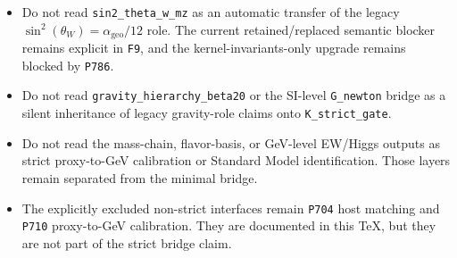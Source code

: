 \begin{itemize}
  \item Do not read \texttt{sin2\_theta\_w\_mz} as an automatic transfer of the legacy $\sin^2(\theta_W)=\alpha_{\mathrm{geo}}/12$ role. The current retained/replaced semantic blocker remains explicit in \texttt{F9}, and the kernel-invariants-only upgrade remains blocked by \texttt{P786}.
  \item Do not read \texttt{gravity\_hierarchy\_beta20} or the SI-level \texttt{G\_newton} bridge as a silent inheritance of legacy gravity-role claims onto \texttt{K\_strict\_gate}.
  \item Do not read the mass-chain, flavor-basis, or GeV-level EW/Higgs outputs as strict proxy-to-GeV calibration or Standard Model identification. Those layers remain separated from the minimal bridge.
  \item The explicitly excluded non-strict interfaces remain \texttt{P704} host matching and \texttt{P710} proxy-to-GeV calibration. They are documented in this TeX, but they are not part of the strict bridge claim.
\end{itemize}

